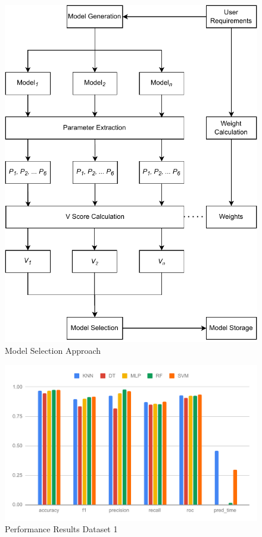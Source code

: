 \documentclass[a4paper,fleqn]{cas-dc}
\begin{document}
\begin{figure}
    \centering
    \includegraphics[width=1.4\columnwidth]{math_model_relaxed.pdf}
    \caption{Model Selection Approach}
    \label{fig:model_selection_approach}
\end{figure}

\begin{figure}[ht]
    \centering
    \includegraphics[width=1.9\columnwidth]{perf_ds_1.pdf}
    \caption{Performance Results Dataset 1} \label{fig:perfromance_results_dataset_1}
\end{figure}
\end{document}

